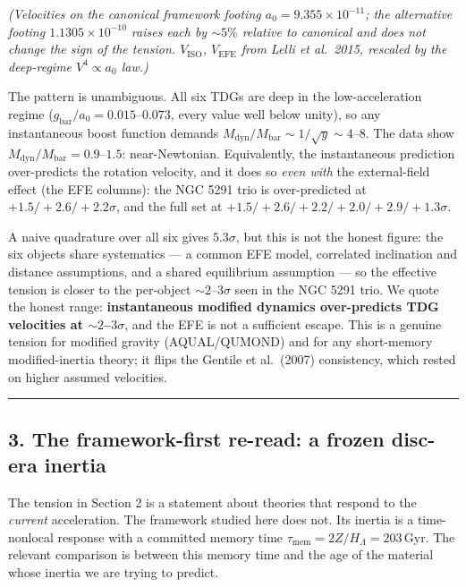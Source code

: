 \documentclass[
]{article}
\begin{document}
\emph{(Velocities on the canonical framework footing
\(a_0=9.355\times10^{-11}\); the alternative footing
\(1.1305\times10^{-10}\) raises each by \(\sim\!5\%\) relative to
canonical and does not change the sign of the tension. \(V_\mathrm{ISO}\),
\(V_\mathrm{EFE}\) from Lelli et al.~2015, rescaled by the deep-regime
\(V^4\propto a_0\) law.)}

The pattern is unambiguous. All six TDGs are deep in the
low-acceleration regime (\(g_\mathrm{bar}/a_0 = 0.015\)--\(0.073\), every
value well below unity), so any instantaneous boost function demands
\(M_\mathrm{dyn}/M_\mathrm{bar}\sim 1/\sqrt{y}\sim 4\)--\(8\). The data show
\(M_\mathrm{dyn}/M_\mathrm{bar}=0.9\)--\(1.5\): near-Newtonian. Equivalently,
the instantaneous prediction over-predicts the rotation velocity, and it
does so \emph{even with} the external-field effect (the EFE columns):
the NGC 5291 trio is over-predicted at \(+1.5/+2.6/+2.2\sigma\), and the
full set at \(+1.5/+2.6/+2.2/+2.0/+2.9/+1.3\sigma\).

A naive quadrature over all six gives \(5.3\sigma\), but this is not the
honest figure: the six objects share systematics --- a common EFE model,
correlated inclination and distance assumptions, and a shared
equilibrium assumption --- so the effective tension is closer to the
per-object \(\sim\!2\)--\(3\sigma\) seen in the NGC 5291 trio. We quote
the honest range: \textbf{instantaneous modified dynamics over-predicts
TDG velocities at \(\sim\!2\)--\(3\sigma\)}, and the EFE is not a
sufficient escape. This is a genuine tension for modified gravity
(AQUAL/QUMOND) and for any short-memory modified-inertia theory; it
flips the Gentile et al.~(2007) consistency, which rested on higher
assumed velocities.

\begin{center}\rule{0.5\linewidth}{0.5pt}\end{center}

\subsection{3. The framework-first re-read: a frozen disc-era
inertia}\label{the-framework-first-re-read-a-frozen-disc-era-inertia}

The tension in Section 2 is a statement about theories that respond to
the \emph{current} acceleration. The framework studied here does not.
Its inertia is a time-nonlocal response with a committed memory time
\(\tau_\mathrm{mem}=2Z/H_\Lambda = 203\,\mathrm{Gyr}\). The relevant
comparison is between this memory time and the age of the material whose
inertia we are trying to predict.
\end{document}
